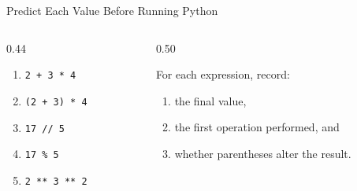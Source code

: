 \documentclass[aspectratio=169,10pt]{beamer}
\begin{document}
\begin{frame}{Predict Each Value Before Running Python}

  \begin{columns}[T,onlytextwidth]

    \begin{column}{0.44\textwidth}

      \begin{enumerate}

        \item \texttt{2 + 3 * 4}

        \item \texttt{(2 + 3) * 4}

        \item \texttt{17 // 5}

        \item \texttt{17 \% 5}

        \item \texttt{2 ** 3 ** 2}

      \end{enumerate}

    \end{column}

    \begin{column}{0.50\textwidth}

      \begin{activity}

        For each expression, record:

        \begin{enumerate}

          \item the final value,

          \item the first operation performed, and

          \item whether parentheses alter the result.

        \end{enumerate}

      \end{activity}

    \end{column}

  \end{columns}

\end{frame}
\end{document}
